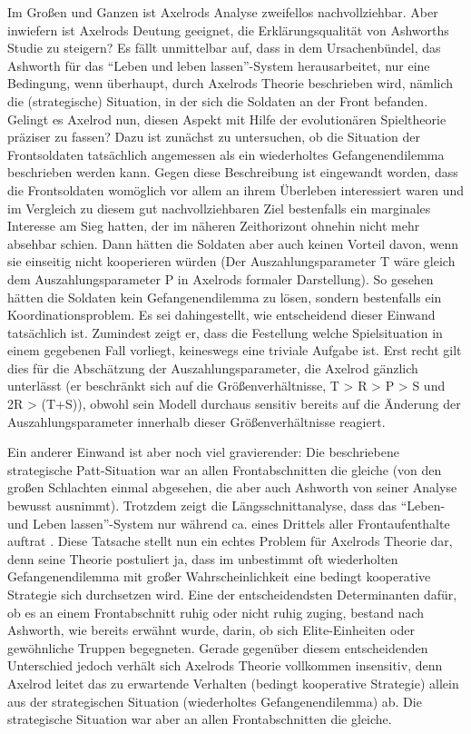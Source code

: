\documentclass[12pt,a4paper,ngerman]{article}
\begin{document}
Im Großen und Ganzen ist Axelrods Analyse zweifellos
nachvollziehbar. Aber inwiefern ist Axelrods Deutung geeignet, die
Erklärungsqualität von Ashworths Studie zu steigern? Es fällt
unmittelbar auf, dass in dem Ursachenbündel, das Ashworth für das
"`Leben und leben lassen"'-System herausarbeitet, nur eine Bedingung,
wenn überhaupt, durch Axelrods Theorie beschrieben wird, nämlich die
(strategische) Situation, in der sich die Soldaten an der Front
befanden. Gelingt es Axelrod nun, diesen Aspekt mit Hilfe der
evolutionären Spieltheorie präziser zu fassen? Dazu ist zunächst zu
untersuchen, ob die Situation der Frontsoldaten tatsächlich angemessen
als ein wiederholtes Gefangenendilemma beschrieben werden kann. Gegen
diese Beschreibung ist eingewandt worden, dass die Frontsoldaten
womöglich vor allem an ihrem Überleben interessiert waren und im
Vergleich zu diesem gut nachvollziehbaren Ziel bestenfalls ein
marginales Interesse am Sieg hatten, der im näheren Zeithorizont
ohnehin nicht mehr absehbar schien. Dann hätten die Soldaten aber auch
keinen Vorteil davon, wenn sie einseitig nicht kooperieren würden (Der
Auszahlungsparameter T wäre gleich dem Auszahlungsparameter P in
Axelrods formaler Darstellung). So gesehen hätten die Soldaten kein
Gefangenendilemma zu lösen, sondern bestenfalls ein
Koordinationsproblem. Es sei dahingestellt, wie entscheidend dieser
Einwand tatsächlich ist. Zumindest zeigt er, dass die Festellung
welche Spielsituation in einem gegebenen Fall vorliegt, keineswegs
eine triviale Aufgabe ist. Erst recht gilt dies für die Abschätzung
der Auszahlungsparameter, die Axelrod gänzlich unterlässt (er beschränkt
sich auf die Größenverhältnisse, T > R > P > S und 2R > (T+S)), obwohl sein
Modell durchaus sensitiv bereits auf die Änderung der Auszahlungsparameter
innerhalb dieser Größenverhältnisse reagiert.

Ein anderer Einwand ist aber noch viel gravierender: Die beschriebene
strategische Patt-Situation war an allen Frontabschnitten die
gleiche (von den großen Schlachten einmal abgesehen, die aber auch
Ashworth von seiner Analyse bewusst ausnimmt). Trotzdem zeigt die
Längsschnittanalyse, dass das "`Leben- und Leben lassen"'-System nur
während ca. eines Drittels aller Frontaufenthalte auftrat
\cite[S. 171-175]{ashworth:1980}. Diese Tatsache stellt nun ein echtes Problem
für Axelrods Theorie dar, denn seine Theorie postuliert ja, dass im unbestimmt
oft wiederholten Gefangenendilemma mit großer Wahrscheinlichkeit eine bedingt
kooperative Strategie sich durchsetzen wird. Eine der entscheidendsten
Determinanten dafür, ob es an einem Frontabschnitt ruhig oder nicht
ruhig zuging, bestand nach Ashworth, wie bereits erwähnt wurde, darin,
ob sich Elite-Einheiten oder gewöhnliche Truppen begegneten. Gerade
gegenüber diesem entscheidenden Unterschied jedoch verhält sich
Axelrods Theorie vollkommen insensitiv, denn Axelrod leitet das zu
erwartende Verhalten (bedingt kooperative Strategie) allein aus der
strategischen Situation (wiederholtes Gefangenendilemma) ab. Die
strategische Situation war aber an allen Frontabschnitten die gleiche.
\end{document}
